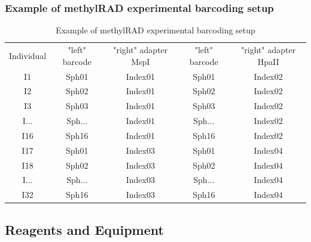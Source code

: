 \documentclass[11pt, oneside]{article}
\begin{document}
\subsubsection {Example of methylRAD experimental barcoding setup}
\begin{table}[]
\caption{Example of methylRAD experimental barcoding setup}
\begin{center}
\begin{tabular}{c|c|c||c|c|}
Individual & "left" barcode & "right" adapter MspI &  "left" barcode & "right" adapter HpaII\\
I1 & Sph01 & Index01 & Sph01 & Index02 \\
I2 & Sph02 & Index01 & Sph02 & Index02 \\
I3 & Sph03 & Index01 & Sph03 & Index02 \\
I... & Sph... & Index01 & Sph... & Index02 \\
I16 & Sph16 & Index01 & Sph16 & Index02 \\
I17 & Sph01 & Index03  & Sph01 & Index04\\
I18 & Sph02 & Index03 & Sph02 & Index04\\
I... & Sph... & Index03 & Sph... & Index04\\
I32 & Sph16 & Index03 & Sph16 & Index04\\
\end{tabular}
\end{center}
\label{default}
\end{table}%

\clearpage
\newpage

	\subsection {Reagents and Equipment}
\end{document}

